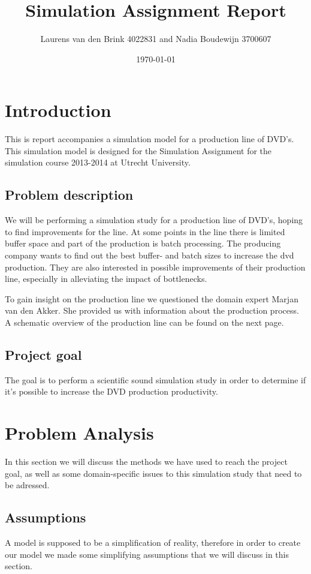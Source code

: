 \documentclass[11pt,a4paper]{article}
\title{Simulation Assignment Report}
\author{Laurens van den Brink 4022831  and Nadia Boudewijn 3700607}
\date{\today}
\begin{document}
\begin{titlepage}
\maketitle{}
\end{titlepage}


\tableofcontents
\clearpage



\section{Introduction}
This is report accompanies a simulation model for a production line of DVD's. This simulation model is designed for the Simulation Assignment for the simulation course  2013-2014 at Utrecht University.
\subsection{Problem description}
We will be performing a simulation study for a production line of DVD's, hoping to find improvements for the line. At some points in the line there is limited buffer space and part of the production is batch processing. The producing company wants to find out the best buffer- and batch sizes to increase the dvd production. They are also interested in possible improvements of their production line, especially in alleviating the impact of bottlenecks. 

To gain insight on the production line we questioned the domain expert Marjan van den Akker. She provided us with information about the production process. A schematic overview of the production line can be found on the next page. 


\subsection{Project goal}
The goal is to perform a scientific sound simulation study in order to determine if it's possible to increase the DVD production productivity. 
\section{Problem Analysis}
In this section we will discuss the methods we have used to reach the project goal, as well as some domain-specific issues to this simulation study that need to be adressed. 


\subsection{Assumptions}
A model is supposed to be a simplification of reality, therefore in order to create our model we made some simplifying assumptions that we will discuss in this section. 
\end{document}
